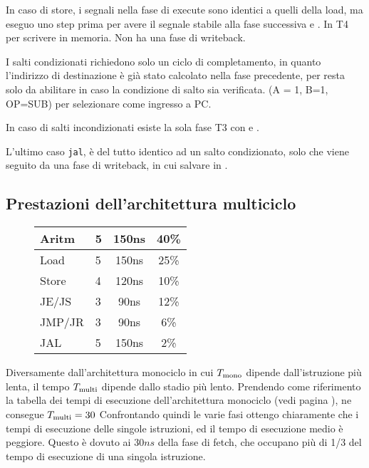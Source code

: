 \documentclass[../ace.tex]{subfiles}
\begin{document}
In caso di store, i segnali nella fase di execute sono identici a quelli della load, ma eseguo  uno step
prima per avere il segnale stabile alla fase successiva e .
In T4  per scrivere in memoria. Non ha una fase di writeback.

I salti condizionati richiedono solo un ciclo di completamento, in quanto l'indirizzo di destinazione è già stato
calcolato nella fase precedente, per resta solo da abilitare  in caso la condizione di salto sia verificata.
(A = 1, B=1, OP=SUB)  per selezionare  come ingresso a PC.

In caso di salti incondizionati esiste la sola fase T3 con  e .

L'ultimo caso \lstinline{jal}, è del tutto identico ad un salto condizionato, solo che viene seguito da una fase di
writeback, in cui salvare  in .
\subsection{Prestazioni dell'architettura multiciclo}
\begin{wrapfigure}{R}{0pt}
    \centering
    \begin{tabu}{|l|lc|c|}
        \hline
        Aritm  & 5& 150ns &40\%\\
        \hline
        Load & 5& 150ns   &25\%\\
        \hline
        Store & 4& 120ns  &10\%\\
        \hline
        JE/JS& 3& 90ns    &12\%\\
        \hline
        JMP/JR& 3& 90ns   &6\%\\
        \hline
        JAL& 5& 150ns     &2\%\\
        \hline
    \end{tabu}
\end{wrapfigure}
Diversamente dall'architettura monociclo in cui $T_\text{mono}$ dipende dall'istruzione più lenta, il tempo $T_\text{multi}$ dipende dallo
stadio più lento.
Prendendo come riferimento la tabella dei tempi di esecuzione dell'architettura monociclo (vedi pagina
\pageref{tab:tempi_esecuzione_monociclo}), ne consegue $T_\text{multi} =30$
Confrontando quindi le varie fasi ottengo chiaramente che i tempi di esecuzione delle singole istruzioni, ed il tempo di
esecuzione medio è peggiore. Questo è dovuto ai $30ns$ della fase di fetch, che occupano più di 1/3 del tempo di
esecuzione di una singola istruzione.
\end{document}

